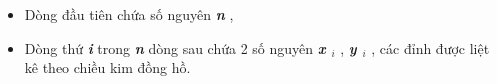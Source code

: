 \begin{itemize}
	\item Dòng đầu tiên chứa số nguyên \textbf{\emph{ n }} ,
	\item Dòng thứ \textbf{\emph{ i }} trong \textbf{\emph{ n }} dòng sau chứa 2 số nguyên \textbf{\emph{ x $_ i $}} , \textbf{\emph{ y $_ i $}} , các đỉnh được liệt kê theo chiều kim đồng hồ.
\end{itemize}

\